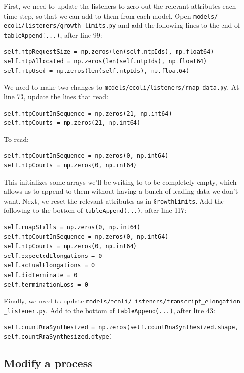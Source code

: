 \documentclass[12pt]{article}
\begin{document}
First, we need to update the listeners to zero out the relevant attributes each time step, so that we can add to them from each model. Open \texttt{models/ \allowbreak ecoli/listeners/growth\_limits.py} and add the following lines to the end of \texttt{tableAppend(...)}, after line 99:

\lstset{language=Python}
\begin{lstlisting}
self.ntpRequestSize = np.zeros(len(self.ntpIds), np.float64)
self.ntpAllocated = np.zeros(len(self.ntpIds), np.float64)
self.ntpUsed = np.zeros(len(self.ntpIds), np.float64)
\end{lstlisting}

We need to make two changes to \texttt{models/ecoli/listeners/rnap\_data.py}. At line 73, update the lines that read:
\lstset{language=Python}
\begin{lstlisting}
self.ntpCountInSequence = np.zeros(21, np.int64)
self.ntpCounts = np.zeros(21, np.int64)
\end{lstlisting}

To read:
\lstset{language=Python}
\begin{lstlisting}
self.ntpCountInSequence = np.zeros(0, np.int64)
self.ntpCounts = np.zeros(0, np.int64)
\end{lstlisting}

This initializes some arrays we'll be writing to to be completely empty, which allows us to append to them without having a bunch of leading data we don't want. Next, we reset the relevant attributes as in \texttt{GrowthLimits}. Add the following to the bottom of \texttt{tableAppend(...)}, after line 117:
\lstset{language=Python}
\begin{lstlisting}
self.rnapStalls = np.zeros(0, np.int64)
self.ntpCountInSequence = np.zeros(0, np.int64)
self.ntpCounts = np.zeros(0, np.int64)
self.expectedElongations = 0
self.actualElongations = 0
self.didTerminate = 0
self.terminationLoss = 0
\end{lstlisting}

Finally, we need to update \texttt{models/ecoli/listeners/transcript\_elongation \allowbreak \_listener.py}. Add to the bottom of \texttt{tableAppend(...)}, after line 43:
\lstset{language=Python}
\begin{lstlisting}
self.countRnaSynthesized = np.zeros(self.countRnaSynthesized.shape, self.countRnaSynthesized.dtype)
\end{lstlisting}

\subsection{Modify a process}
\end{document}
